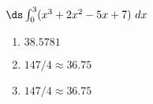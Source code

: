 {$\ds \int_{0}^{3} (x^3+2x^2-5x+7)\ dx$}
{\begin{enumerate}
\item		$38.5781$
\item		$147/4\approx 36.75$
\item		$147/4\approx 36.75$
\end{enumerate}
}